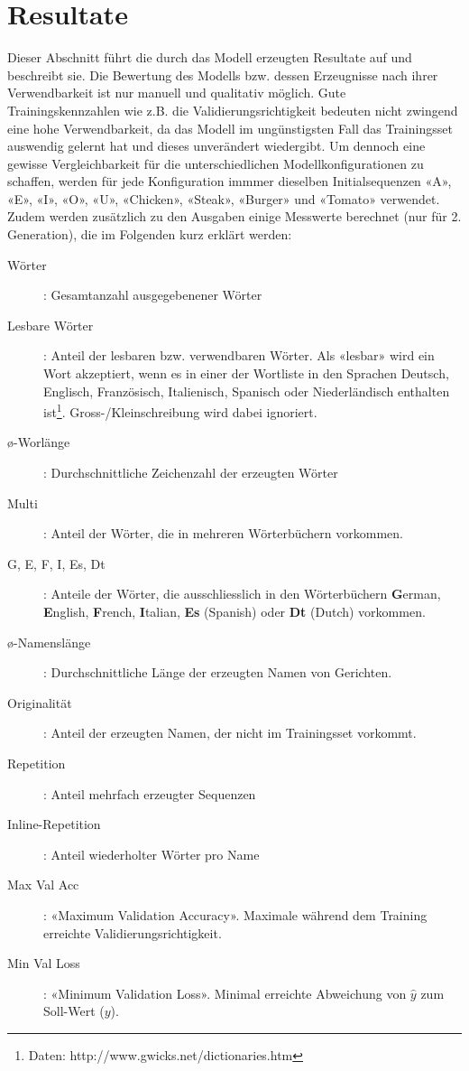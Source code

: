 \chapter{Resultate}
\label{ch:results}

\newcommand{\sn} {\vspace{1.2mm}\newline}

Dieser Abschnitt führt die durch das Modell erzeugten Resultate auf und beschreibt sie.
Die Bewertung des Modells bzw. dessen Erzeugnisse nach ihrer Verwendbarkeit ist nur manuell und qualitativ möglich.
Gute Trainingskennzahlen wie z.B. die Validierungsrichtigkeit bedeuten nicht zwingend eine hohe Verwendbarkeit, da das Modell im ungünstigsten Fall das Trainingsset auswendig gelernt hat und dieses unverändert wiedergibt.
Um dennoch eine gewisse Vergleichbarkeit für die unterschiedlichen Modellkonfigurationen zu schaffen, werden für jede Konfiguration immmer dieselben Initialsequenzen «A», «E», «I», «O», «U», «Chicken», «Steak», «Burger» und «Tomato» verwendet.
Zudem werden zusätzlich zu den Ausgaben einige Messwerte berechnet (nur für 2. Generation), die im Folgenden kurz erklärt werden:

\begin{description}
    \item[Wörter]: Gesamtanzahl ausgegebenener Wörter
    \item[Lesbare Wörter]: Anteil der lesbaren bzw. verwendbaren Wörter.
    Als «lesbar» wird ein Wort akzeptiert, wenn es in einer der Wortliste in den Sprachen Deutsch, Englisch, Französisch, Italienisch, Spanisch oder Niederländisch enthalten ist\footnote{Daten: http://www.gwicks.net/dictionaries.htm}.
    Gross-/Kleinschreibung wird dabei ignoriert.
    \item[ø-Worlänge]: Durchschnittliche Zeichenzahl der erzeugten Wörter
    \item[Multi]: Anteil der Wörter, die in mehreren Wörterbüchern vorkommen.
    \item[G, E, F, I, Es, Dt]: Anteile der Wörter, die ausschliesslich in den Wörterbüchern \textbf{G}erman, \textbf{E}nglish, \textbf{F}rench, \textbf{I}talian, \textbf{Es} (Spanish) oder \textbf{Dt} (Dutch) vorkommen.
    \item[ø-Namenslänge]: Durchschnittliche Länge der erzeugten Namen von Gerichten.
    \item[Originalität]: Anteil der erzeugten Namen, der nicht im Trainingsset vorkommt.
    \item[Repetition]: Anteil mehrfach erzeugter Sequenzen
    \item[Inline-Repetition]: Anteil wiederholter Wörter pro Name
    \item[Max Val Acc]: «Maximum Validation Accuracy».
    Maximale während dem Training erreichte Validierungsrichtigkeit.
    \item[Min Val Loss]: «Minimum Validation Loss».
    Minimal erreichte Abweichung von $ \hat{y} $ zum Soll-Wert ($ y $).
\end{description}

